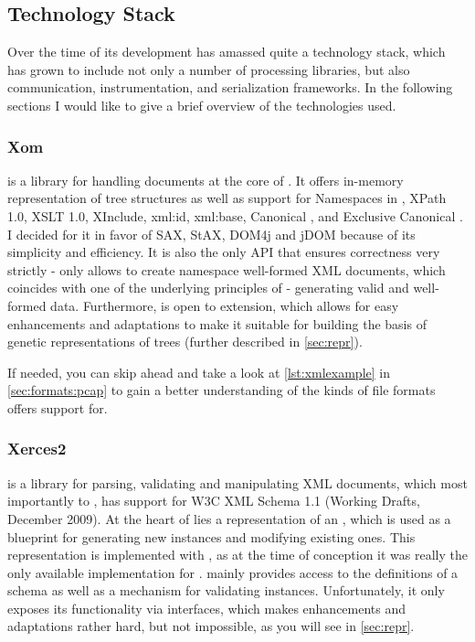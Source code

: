 \subsection{Technology Stack}
\label{sec:tech}
Over the time of its development \xmlmate has amassed quite a technology stack, 
which has grown to include not only a number of \xml processing libraries, but also communication, instrumentation, and serialization frameworks. 
In the following sections I would like to give a brief overview of the technologies used.
\subsubsection{Xom}
\xom{}\cite{xom} is a \java library for handling \xml documents at the core of \xmlmate. 
It offers in-memory representation of \xml tree structures as well as support for Namespaces in \xml, {\small XPath 1.0}, {\small XSLT 1.0}, 
{\small XInclude}, {\small xml:id}, {\small xml:base}, Canonical \xml, and Exclusive Canonical \xml.
I decided for it in favor of {\small SAX}, {\small StAX}, {\small DOM4j} and {\small jDOM} because of its simplicity and efficiency.
It is also the only \xml API that ensures correctness very strictly - \xom only allows to create namespace well-formed XML documents, 
which coincides with one of the underlying principles of \xmlmate{} - generating valid and well-formed data.
Furthermore, \xom is open to extension, which allows for easy enhancements and adaptations to make it suitable 
for building the basis of genetic representations of \xml trees (further described in \cref{sec:repr}).

If needed, you can skip ahead and take a look at \cref{lst:xmlexample} in \cref{sec:formats:pcap}
to gain a better understanding of the kinds of file formats \xom offers support for.
\subsubsection{Xerces2}
\xerces{}\cite{xerces} is a \java library for parsing, validating and manipulating XML documents, which most
importantly to \xmlmate, has support for W3C XML Schema 1.1 (Working Drafts, December 2009).
At the heart of \xmlmate lies a representation of an \xsd, which is used as a blueprint for generating new
\xml instances and modifying existing ones. This representation is implemented with \xerces, as at the time of
conception it was really the only available \xsd implementation for \java. \xerces mainly provides access to
the definitions of a schema as well as a mechanism for validating \xml instances. Unfortunately, it only
exposes its functionality via \java interfaces, which makes enhancements and adaptations rather hard, but not
impossible, as you will see in \cref{sec:repr}. 
